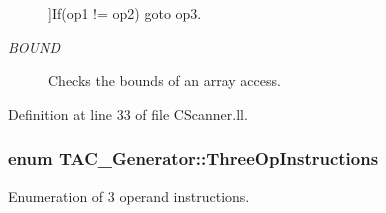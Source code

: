 \begin{Desc}
\begin{description}
{}]If(op1 != op2) goto op3. \item[{\em 
\hypertarget{classTAC__Generator_ae032b80a215a10604c5273b65e7dab4ca0fe34906704a5f10788014753af64d88}{B\-O\-U\-N\-D}\label{classTAC__Generator_ae032b80a215a10604c5273b65e7dab4ca0fe34906704a5f10788014753af64d88}
}]Checks the bounds of an array access. \end{description}
\end{Desc}


Definition at line 33 of file C\-Scanner.\-ll.

\hypertarget{classTAC__Generator_ae032b80a215a10604c5273b65e7dab4c}{
\subsubsection[{Three\-Op\-Instructions}]{\setlength{\rightskip}{0pt plus 5cm}enum {\bf T\-A\-C\-\_\-\-Generator\-::\-Three\-Op\-Instructions}}}\label{classTAC__Generator_ae032b80a215a10604c5273b65e7dab4c}


Enumeration of 3 operand instructions. 

